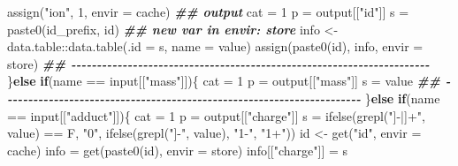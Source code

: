 \documentclass[
]{article}
\newenvironment{Shaded}{\begin{snugshade}}{\end{snugshade}}
\newcommand{\AttributeTok}[1]{\textcolor[rgb]{0.77,0.63,0.00}{#1}}
\newcommand{\ControlFlowTok}[1]{\textcolor[rgb]{0.13,0.29,0.53}{\textbf{#1}}}
\newcommand{\DecValTok}[1]{\textcolor[rgb]{0.00,0.00,0.81}{#1}}
\newcommand{\DocumentationTok}[1]{\textcolor[rgb]{0.56,0.35,0.01}{\textbf{\textit{#1}}}}
\newcommand{\FunctionTok}[1]{\textcolor[rgb]{0.00,0.00,0.00}{#1}}
\newcommand{\NormalTok}[1]{#1}
\newcommand{\OtherTok}[1]{\textcolor[rgb]{0.56,0.35,0.01}{#1}}
\newcommand{\SpecialCharTok}[1]{\textcolor[rgb]{0.00,0.00,0.00}{#1}}
\newcommand{\StringTok}[1]{\textcolor[rgb]{0.31,0.60,0.02}{#1}}
\begin{document}
\begin{Shaded}
\begin{Highlighting}[]
      \FunctionTok{assign}\NormalTok{(}\StringTok{"ion"}\NormalTok{, }\DecValTok{1}\NormalTok{, }\AttributeTok{envir =}\NormalTok{ cache)}
      \DocumentationTok{\#\# output}
\NormalTok{      cat }\OtherTok{=} \DecValTok{1}
\NormalTok{      p }\OtherTok{=}\NormalTok{ output[[}\StringTok{"id"}\NormalTok{]]}
\NormalTok{      s }\OtherTok{=} \FunctionTok{paste0}\NormalTok{(id\_prefix, id)}
      \DocumentationTok{\#\# new var in envir: store}
\NormalTok{      info }\OtherTok{\textless{}{-}}\NormalTok{ data.table}\SpecialCharTok{::}\FunctionTok{data.table}\NormalTok{(}\AttributeTok{.id =}\NormalTok{ s, }\AttributeTok{name =}\NormalTok{ value)}
      \FunctionTok{assign}\NormalTok{(}\FunctionTok{paste0}\NormalTok{(id), info, }\AttributeTok{envir =}\NormalTok{ store)}
      \DocumentationTok{\#\# {-}{-}{-}{-}{-}{-}{-}{-}{-}{-}{-}{-}{-}{-}{-}{-}{-}{-}{-}{-}{-}{-}{-}{-}{-}{-}{-}{-}{-}{-}{-}{-}{-}{-}{-}{-}{-}{-}{-}{-}{-}{-}{-}{-}{-}{-}{-}{-}{-}{-}{-}{-}{-}{-}{-}{-}{-}{-}{-}{-}{-}{-}{-}{-}{-}{-}{-}{-}{-}{-} }
\NormalTok{    \}}\ControlFlowTok{else} \ControlFlowTok{if}\NormalTok{(name }\SpecialCharTok{==}\NormalTok{ input[[}\StringTok{"mass"}\NormalTok{]])\{}
\NormalTok{      cat }\OtherTok{=} \DecValTok{1}
\NormalTok{      p }\OtherTok{=}\NormalTok{ output[[}\StringTok{"mass"}\NormalTok{]]}
\NormalTok{      s }\OtherTok{=}\NormalTok{ value}
      \DocumentationTok{\#\# {-}{-}{-}{-}{-}{-}{-}{-}{-}{-}{-}{-}{-}{-}{-}{-}{-}{-}{-}{-}{-}{-}{-}{-}{-}{-}{-}{-}{-}{-}{-}{-}{-}{-}{-}{-}{-}{-}{-}{-}{-}{-}{-}{-}{-}{-}{-}{-}{-}{-}{-}{-}{-}{-}{-}{-}{-}{-}{-}{-}{-}{-}{-}{-}{-}{-}{-}{-}{-}{-} }
\NormalTok{    \}}\ControlFlowTok{else} \ControlFlowTok{if}\NormalTok{(name }\SpecialCharTok{==}\NormalTok{ input[[}\StringTok{"adduct"}\NormalTok{]])\{}
\NormalTok{      cat }\OtherTok{=} \DecValTok{1}
\NormalTok{      p }\OtherTok{=}\NormalTok{ output[[}\StringTok{"charge"}\NormalTok{]]}
\NormalTok{      s }\OtherTok{=} \FunctionTok{ifelse}\NormalTok{(}\FunctionTok{grepl}\NormalTok{(}\StringTok{"]{-}|]+"}\NormalTok{, value) }\SpecialCharTok{==}\NormalTok{ F, }\StringTok{"0"}\NormalTok{,}
        \FunctionTok{ifelse}\NormalTok{(}\FunctionTok{grepl}\NormalTok{(}\StringTok{"]{-}"}\NormalTok{, value), }\StringTok{"1{-}"}\NormalTok{, }\StringTok{"1+"}\NormalTok{))}
\NormalTok{      id }\OtherTok{\textless{}{-}} \FunctionTok{get}\NormalTok{(}\StringTok{"id"}\NormalTok{, }\AttributeTok{envir =}\NormalTok{ cache)}
\NormalTok{      info }\OtherTok{=} \FunctionTok{get}\NormalTok{(}\FunctionTok{paste0}\NormalTok{(id), }\AttributeTok{envir =}\NormalTok{ store)}
\NormalTok{      info[[}\StringTok{"charge"}\NormalTok{]] }\OtherTok{=}\NormalTok{ s}

\end{Highlighting}
\end{Shaded}
\end{document}
